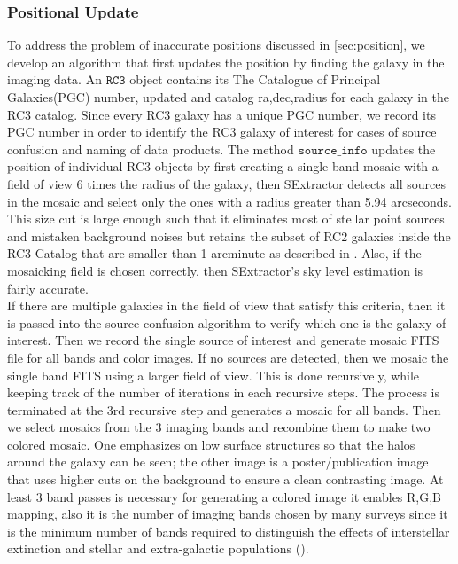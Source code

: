 \documentclass[5p]{elsarticle}
\begin{document}
	\subsubsection{Positional Update} 
	To address the problem of inaccurate positions discussed in \autoref{sec:position}, we develop an algorithm that first updates the position by finding the galaxy in the imaging data. An  $\texttt{RC3}$ object contains its The Catalogue of Principal Galaxies(PGC) number, updated and catalog ra,dec,radius for each galaxy in the RC3 catalog. Since every RC3 galaxy has a unique PGC number, we record  its PGC number in order to identify the RC3 galaxy of interest for cases of source confusion and naming of data products. The method $\texttt{source\_info}$ updates the position of individual RC3 objects by first creating a single band mosaic with a field of view 6 times the radius of the galaxy, then SExtractor detects all sources in the mosaic and select only the ones with a radius greater than 5.94 arcseconds. This size cut is large enough such that it eliminates most of stellar point sources and mistaken background noises  but retains the subset of RC2 galaxies inside the RC3 Catalog that are smaller than 1 arcminute as described in \citet{rc2}. Also, if the mosaicking field is chosen correctly, then SExtractor's sky level estimation is fairly accurate.  
\\
\indent If there are multiple galaxies in the field of view that satisfy this criteria, then it is passed into the source confusion algorithm to verify which one is the galaxy of interest. Then we record the single source of interest and generate mosaic FITS file for all bands and color images. If no sources are detected, then we mosaic  the single band FITS using a larger field of view. This is done recursively, while keeping track of the number of iterations in each recursive steps. The process is terminated at the 3rd recursive step and generates a mosaic for all bands. Then we select mosaics from the 3 imaging bands  and recombine them to make two  colored mosaic. One emphasizes on low surface structures  so that the halos around the galaxy can be seen; the other image is a poster/publication image that uses higher cuts on the background to ensure a clean contrasting image. At least 3 band passes is necessary for generating a colored image it enables  R,G,B mapping, also it is the number of imaging bands chosen by many surveys since it is the minimum number of bands required to distinguish the effects of interstellar extinction and stellar and extra-galactic populations (\citet{2mass}).
\end{document}
